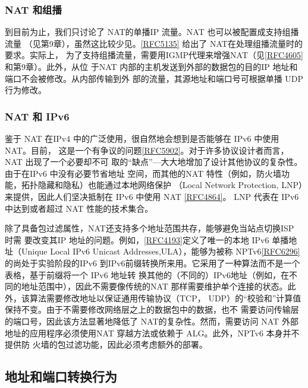 \subsubsection{ NAT 和组播}

到目前为止，我们只讨论了 NAT的单播IP 流量。NAT 也可以被配置成支持组播流量
（见第9章），虽然这比较少见。\href{https://www.rfc-editor.org/rfc/rfc5135}{[RFC5135]}
给出了 NAT在处理组播流量时的要求。实际上，
为了支持组播流量，需要用IGMP代理来增强NAT（见\href{https://www.rfc-editor.org/rfc/rfc4605}{[RFC4605]}和第9章）。此外，从位
于NAT 内部的主机发送到外部的数据包的目的IP 地址和端口不会被修改。从内部传输到外
部的流量，其源地址和端口号可根据单播 UDP 行为修改。

\subsubsection{NAT 和 IPv6}

鉴于 NAT 在IPv4 中的广泛使用，很自然地会想到是否能够在 IPv6 中使用 NAT。目前，
这是一个有争议的问题\href{https://www.rfc-editor.org/rfc/rfc5902}{[RFC5902]}。对于许多协议设计者而言，NAT
出现了一个必要却不可
取的“缺点”—大大地增加了设计其他协议的复杂性。由于在IPv6 中没有必要节省地址
空间，而其他的NAT 特性（例如，防火墙功能，拓扑隐藏和隐私）也能通过本地网络保护
（Local Network Protection, LNP）来提供，因此人们坚决抵制在 IPv6 中使用 NAT
\href{https://www.rfc-editor.org/rfc/rfc4864}{[RFC4864]}。
LNP 代表在 IPv6 中达到或者超过 NAT 性能的技术集合。

除了具备包过滤属性，NAT还支持多个地址范围共存，能够避免当站点切换ISP 时需
要改变其IP
地址的问题。例如，\href{https://www.rfc-editor.org/rfc/rfc4193}{[RFC4193]}定义了唯一的本地
IPv6 单播地址（Unique Local
IPv6 Unicast Addresses,ULA），能够为被称
NPTv6\href{https://www.rfc-editor.org/rfc/rfc6296}{[RFC6296]}的尚处于实验阶段的IPv6
到IPv6前缀转换所来用。它采用了一种算法而不是一个表格，基于前缀将一个 IPv6 地址转
换其他的（不同的）IPv6地址（例如，在不同的地址范围中），因此不需要像传统的NAT
那样需要维护单个连接的状态。此外，该算法需要修改地址以保证通用传输协议（TCP，
UDP）的“校验和”计算值保持不变。由于不需要修改网络层之上的数据包中的数据，也不
需要访问传输层的端口号，因此该方法显著地降低了 NAT的复杂性。然而，需要访问 NAT
外部地址的应用程序必须使用NAT 穿越方法或依赖于 ALG。此外，NPTv6 本身并不提供防
火墙的包过滤功能，因此必须考虑额外的部署。

\subsection{地址和端口转换行为}

